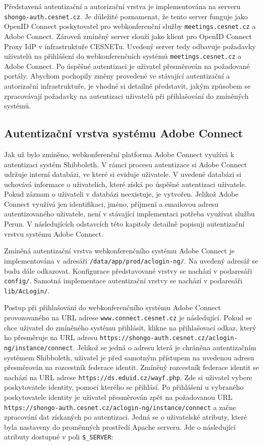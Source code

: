 \documentclass[
  printed, %
  twoside, %
  table,   %
  nolof,     %
  nolot,     %
]{fithesis3}
\begin{document}
Představená autentizační a autorizační vrstva je implementována na serveru \texttt{shongo-auth.cesnet.cz}. Je důležité poznamenat, že tento server funguje jako OpenID Connect poskytovatel pro webkonferenční služby \texttt{meetings.cesnet.cz} a Adobe Connect. Zároveň zmíněný server slouží jako klient pro OpenID Connect Proxy IdP v infrastruktuře CESNETu. Uvedený server tedy odbavuje požadavky uživatelů na přihlášení do webkonferenčních systémů \texttt{meetings.cesnet.cz} a Adobe Connect. Po úspěšné autentizaci je uživatel přesměrován na požadované portály. Abychom pochopily změny provedené ve stávající autentizační a autorizační infrastruktuře, je vhodné si detailně představit, jakým způsobem se zpracovávají požadavky na autentizaci uživatelů při přihlašování do zmíněných systémů.  

\subsection{Autentizační vrstva systému Adobe Connect}
\label{ac-old}
Jak už bylo zmíněno, webkonferenční platforma Adobe Connect využívá k autentizaci systém Shibboleth. V rámci procesu autentizace si Adobe Connect udržuje interní databázi, ve které si eviduje uživatele. V
uvedené databázi si uchovává informace o uživatelích,
které získá po úspěšné autentizaci uživatele. Pokud záznam o uživateli
v databázi neexistuje, je vytvořen. Jelikož Adobe Connect využívá jen
identifikaci, jméno, příjmení a emailovou adresu autentizovaného uživatele, není v stávající implementaci
potřeba využívat službu Perun. V následujících odstavcích této kapitoly detailně popisuji autentizační vrstvu systému Adobe Connect. \par

Zmíněná autentizační vrstva webkonferenčního systému Adobe Connect je implementována v adresáři \texttt{/data/app/prod/aclogin-ng/}. Na uvedený adresář se budu dále odkazovat. Konfigurace představované vrstvy se nachází v podaresáři \texttt{config/}. Samotná implementace autentizační vrstvy se nachází v podaresáři \texttt{lib/AcLogin/}. \par

Postup při přihlašování do webkonferenčního systému Adobe Connect provozovaného na URL adrese \texttt{www.connect.cesnet.cz} je následující. Pokud se chce uživatel do zmíněného systému přihlásit, klikne na přihlašovací odkaz, který ho přesměruje na URL adresu \texttt{https://shongo-auth.cesnet.cz/aclogin-ng/instance/connect}. Jelikož se jedná o adresu která je chráněna autentizačním systémem Shibboleth, uživatel je před samotným přístupem na uvedenou adresu přesměrován na rozcestník federace identit. Zmíněný rozcestník federace identit se nachází na URL adrese \texttt{https://ds.eduid.cz/wayf.php}. Zde si uživatel vybere poskytovatele identity, pomocí kterého se přihlásí. Po přihlášení u vybraného poskytovatele identity je uživatel  přesměrován zpět na požadovanou URL \texttt{https://shongo-auth.cesnet.cz/aclogin-ng/instance/connect} a začne zpracování dat získaných po autentizaci. Jedná se o uživatelské atributy, které byla nastaveny do proměnných prostředí Apache serveru. Jde o následující atributy dostupné v poli \texttt{\$\_SERVER}: 
\end{document}
